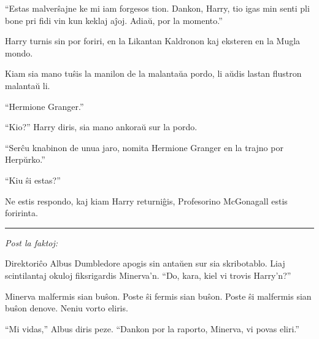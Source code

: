 ``Estas malverŝajne ke mi iam forgesos tion. Dankon, Harry, tio igas
min senti pli bone pri fidi vin kun keklaj aĵoj. Adiaŭ, por la
momento.''

Harry turnis sin por foriri, en la Likantan Kaldronon kaj eksteren en
la Mugla mondo.

Kiam sia mano tuŝis la manilon de la malantaŭa pordo, li aŭdis lastan
flustron malantaŭ li.

``Hermione Granger.''

``Kio?'' Harry diris, sia mano ankoraŭ sur la pordo.

``Serĉu knabinon de unua jaro, nomita Hermione Granger en la trajno
por Herpŭrko.''

``Kiu ŝi estas?''

Ne estis respondo, kaj kiam Harry returniĝis, Profesorino McGonagall
estis foririnta.

\begin{center}\rule{3in}{0.4pt}\end{center}

\emph{Post la faktoj:}

Direktoriĉo Albus Dumbledore apogis sin antaŭen sur sia skribotablo. Liaj
scintilantaj okuloj fiksrigardis Minerva'n. ``Do, kara, kiel vi
trovis Harry'n?''

Minerva malfermis sian buŝon. Poste ŝi fermis sian buŝon. Poste ŝi
malfermis sian buŝon denove. Neniu vorto eliris.

``Mi vidas,'' Albus diris peze. ``Dankon por la raporto, Minerva, vi
povas eliri.''
